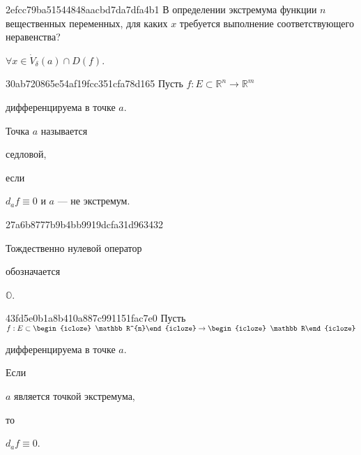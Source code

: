 \begin{note}{2efcc79ba51544848aacbd7da7dfa4b1}
    В определении экстремума функции \({ n }\) вещественных переменных, для каких \({ x }\) требуется выполнение соответствующего неравенства?

    \begin{cloze}{1}
        \({ \forall x \in \dot V_{\delta}(a) \cap D(f) }\).
    \end{cloze}
\end{note}

\begin{note}{30ab720865e54af19fcc351cfa78d165}
    Пусть \({ f : E \subset \mathbb R^{n} \to \mathbb R^{m} }\) \begin{icloze}{3}дифференцируема в точке \({ a }\).\end{icloze}
    Точка \({ a }\) называется \begin{icloze}{2}седловой,\end{icloze} если \begin{icloze}{1}\({ d_{a}f \equiv 0 }\) и \({ a }\) --- не экстремум.\end{icloze}
\end{note}

\begin{note}{27a6b8777b9b4bb9919dcfa31d963432}
    \begin{icloze}{2}Тождественно нулевой оператор\end{icloze} обозначается \begin{icloze}{1}\({ \mathbb O }\).\end{icloze}
\end{note}

\begin{note}{43fd5e0b1a8b410a887c991151fac7e0}
    Пусть \({ f : E \subset \begin{icloze}{4}\mathbb R^{n}\end{icloze} \to \begin{icloze}{4}\mathbb R\end{icloze} }\) \begin{icloze}{3}дифференцируема в точке \({ a }\).\end{icloze}
    Если \begin{icloze}{2}\({ a }\) является точкой экстремума,\end{icloze} то \begin{icloze}{1}\({ d_{a}f \equiv 0 }\).\end{icloze}
\end{note}

